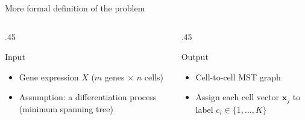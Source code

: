 \documentclass[
  12pt,
  ignorenonframetext,
  aspectratio=169]{beamer}
\providecommand{\tightlist}{%
  \setlength{\itemsep}{0pt}\setlength{\parskip}{0pt}}
\begin{document}
\begin{frame}{More formal definition of the problem}
\protect{}\label{more-formal-definition-of-the-problem}
\begin{columns}[T]
\begin{column}{.45\linewidth}
\begin{block}{Input}
\protect{}\label{input-1}
\begin{itemize}
\tightlist
\item
  Gene expression \(X\) (\(m\) genes \(\times\) \(n\) cells)
\item
  Assumption: a differentiation process (minimum spanning tree)
\end{itemize}
\end{block}
\end{column}

\begin{column}{.45\linewidth}
\begin{block}{Output}
\protect{}\label{output-1}
\begin{itemize}
\tightlist
\item
  Cell-to-cell MST graph
\item
  Assign each cell vector \(\mathbf{x}_{j}\) to label
  \(c_i \in \{1, \ldots, K\}\)
\end{itemize}
\end{block}
\end{column}
\end{columns}
\end{frame}
\end{document}

